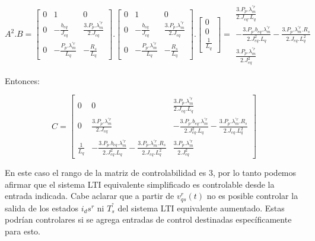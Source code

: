\documentclass{article}
\begin{document}
\begin{equation*}
    A^2.B =
    \begin{bmatrix}
        0 & 1 & 0 \\
        0 & -\frac{b_{eq}}{J_{eq}} & \frac{3.P_p.\lambda_m^{\prime r}}{2.J_{eq}} \\
        0 & -\frac{P_p.\lambda_m^{\prime r}}{L_q} & -\frac{R_s}{L_q}
    \end{bmatrix}.
    \begin{bmatrix}
        0 & 1 & 0 \\
        0 & -\frac{b_{eq}}{J_{eq}} & \frac{3.P_p.\lambda_m^{\prime r}}{2.J_{eq}} \\
        0 & -\frac{P_p.\lambda_m^{\prime r}}{L_q} & -\frac{R_s}{L_q}
    \end{bmatrix}.
    \begin{bmatrix}
        0 \\
        0 \\
        \frac{1}{L_q}
    \end{bmatrix}
    =
    \begin{matrix}
        \frac{3.P_p.\lambda_m^{\prime r}}{2.J_{eq}.L_q} \\
        -\frac{3.P_p.b_{eq}.\lambda_m^{\prime r}}{2.J_{eq}^2.L_q} - \frac{3.P_p.\lambda_m^{\prime r}.R_s}{2.J_{eq}.L_q^2} \\
        \frac{3.P_p.\lambda_m^{\prime r}}{2.J_{eq}^2}
    \end{matrix}
\end{equation*}

Entonces:

\begin{equation*}
    C = 
    \begin{bmatrix}
        0 & 0 & \frac{3.P_p.\lambda_m^{\prime r}}{2.J_{eq}.L_q} \\
        0 & \frac{3.P_p.\lambda_m^{\prime r}}{2.J_{eq}} & -\frac{3.P_p.b_{eq}.\lambda_m^{\prime r}}{2.J_{eq}^2.L_q} - \frac{3.P_p.\lambda_m^{\prime r}.R_s}{2.J_{eq}.L_q^2} \\
        \frac{1}{L_q} & -\frac{3.P_p.b_{eq}.\lambda_m^{\prime r}}{2.J_{eq}^2.L_q} - \frac{3.P_p.\lambda_m^{\prime r}.R_s}{2.J_{eq}.L_q^2} & \frac{3.P_p.\lambda_m^{\prime r}}{2.J_{eq}^2}
    \end{bmatrix}
\end{equation*}

En este caso el rango de la matriz de controlabilidad es 3, por lo tanto podemos afirmar que el 
sistema LTI equivalente simplificado es controlable desde la entrada indicada. Cabe aclarar que 
a partir de $v_{qs}^r(t)$ no es posible controlar la salida de los estados $i_ds^r$ ni $T_s^°$ 
del sistema LTI equivalente aumentado. Estas podrían controlares si se agrega entradas de control 
destinadas específicamente para esto.
\end{document}
